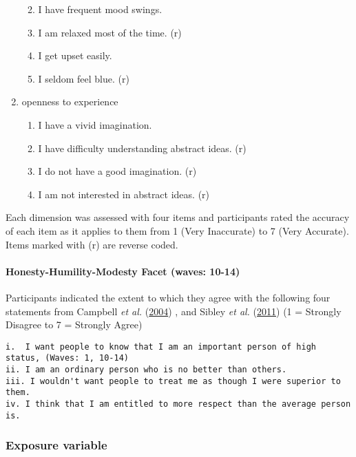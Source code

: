\documentclass[
  singlecolumn,
  9pt]{article}
\let\oldparagraph\paragraph
\renewcommand{\paragraph}[1]{\oldparagraph{#1}\mbox{}}
\providecommand{\tightlist}{%
  \setlength{\itemsep}{0pt}\setlength{\parskip}{0pt}}\usepackage{longtable,booktabs,array}
\begin{document}
\begin{enumerate}
  \begin{enumerate}
  \def\labelenumii{\roman{enumii}.}
  \tightlist
  \item
    I have frequent mood swings.
  \item
    I am relaxed most of the time. (r)
  \item
    I get upset easily.
  \item
    I seldom feel blue. (r)
  \end{enumerate}
\item
  openness to experience

  \begin{enumerate}
  \def\labelenumii{\roman{enumii}.}
  \tightlist
  \item
    I have a vivid imagination.
  \item
    I have difficulty understanding abstract ideas. (r)
  \item
    I do not have a good imagination. (r)
  \item
    I am not interested in abstract ideas. (r)
  \end{enumerate}
\end{enumerate}

Each dimension was assessed with four items and participants rated the
accuracy of each item as it applies to them from 1 (Very Inaccurate) to
7 (Very Accurate). Items marked with (r) are reverse coded.

\paragraph{Honesty-Humility-Modesty Facet (waves:
10-14)}\label{honesty-humility-modesty-facet-waves-10-14}

Participants indicated the extent to which they agree with the following
four statements from Campbell \emph{et al.}
(\hyperref[ref-campbell2004]{2004}) , and Sibley \emph{et al.}
(\hyperref[ref-sibley2011]{2011}) (1 = Strongly Disagree to 7 = Strongly
Agree)

\begin{verbatim}
i.  I want people to know that I am an important person of high status, (Waves: 1, 10-14)
ii. I am an ordinary person who is no better than others.
iii. I wouldn't want people to treat me as though I were superior to them.
iv. I think that I am entitled to more respect than the average person is.
\end{verbatim}

\subsubsection{Exposure variable}\label{exposure-variable}
\end{document}
